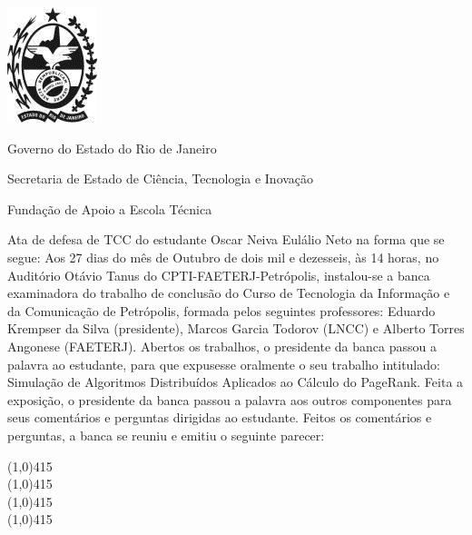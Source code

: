 \documentclass[a4paper]{report} %
\begin{document}

\begin{center}
	\includegraphics[scale=0.5]{images/brasao}
	
	
	Governo do Estado do Rio de Janeiro
	
	
	Secretaria de Estado de Ciência, Tecnologia e Inovação
	
	
	Fundação de Apoio a Escola Técnica
\end{center}

\vspace*{0.2cm}

\noindent Ata de defesa de TCC do estudante Oscar Neiva Eulálio Neto na forma que se segue: Aos 27 dias do mês de Outubro de dois mil e dezesseis, às 14 horas, no Auditório Otávio Tanus do CPTI-FAETERJ-Petrópolis, instalou-se a banca examinadora do trabalho de conclusão do Curso de Tecnologia da Informação e da Comunicação de Petrópolis, formada pelos seguintes professores: Eduardo Krempser da Silva (presidente), Marcos Garcia Todorov (LNCC) e Alberto Torres Angonese (FAETERJ). Abertos os trabalhos, o presidente da banca passou a palavra ao estudante, para que expusesse oralmente o seu trabalho intitulado: Simulação de Algoritmos Distribuídos Aplicados ao Cálculo do PageRank. Feita a exposição, o presidente da banca passou a palavra aos outros componentes para seus comentários e perguntas dirigidas ao estudante. Feitos os comentários e perguntas, a banca se reuniu e emitiu o seguinte parecer:


\begin{center}
\line(1,0){415}\\
\line(1,0){415}\\
\line(1,0){415}\\
\line(1,0){415}\\
\end{center}
\end{document}
